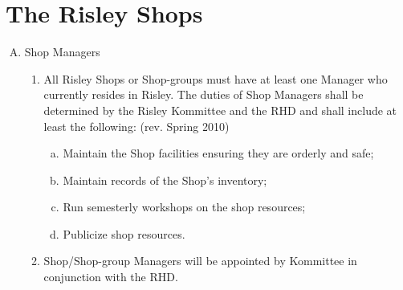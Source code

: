 \documentclass[12pt]{article}
\begin{document}
\section{The Risley Shops}
\begin{enumerate}[A.]
\item Shop Managers
\begin{enumerate}[1.]
\item All Risley Shops or Shop-groups must have at least one Manager who currently resides in Risley. The duties of Shop Managers shall be determined by the Risley Kommittee and the RHD and shall include at least the following: (rev. Spring 2010)
\begin{enumerate}[a.]
\item Maintain the Shop facilities ensuring they are orderly and safe;
\item Maintain records of the Shop's inventory;
\item Run semesterly workshops on the shop resources;
\item Publicize shop resources.
\end{enumerate}
\item Shop/Shop-group Managers will be appointed by Kommittee in conjunction with the RHD.
\end{enumerate}
\end{enumerate}
\end{document}
